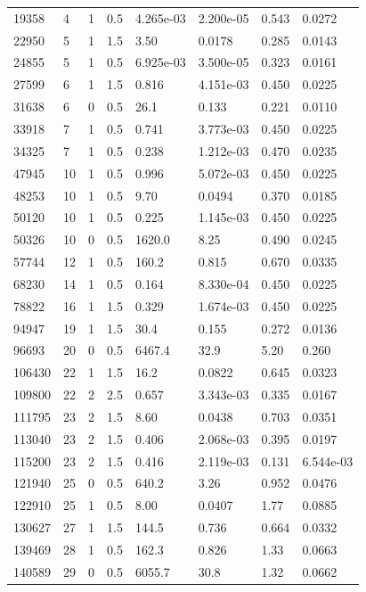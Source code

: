 \documentclass[preview]{standalone}
\begin{document}
{{\begin{tabular}{L{1.2cm}C{1.2cm} C{0.3cm}C{0.5cm} C{1.4cm}C{1.4cm} C{1.4cm}C{1.4cm}}
  19358  &     4  & 1     & 0.5 &  4.265e-03  & 2.200e-05  & 0.543 &  0.0272   \\ 
  22950  &     5  & 1     & 1.5 &  3.50  & 0.0178  & 0.285 &  0.0143   \\ 
  24855  &     5  & 1     & 0.5 &  6.925e-03  & 3.500e-05  & 0.323 &  0.0161   \\ 
  27599  &     6  & 1     & 1.5 &  0.816  & 4.151e-03  & 0.450 &  0.0225   \\ 
  31638  &     6  & 0     & 0.5 &  26.1  & 0.133  & 0.221 &  0.0110   \\ 
  33918  &     7  & 1     & 0.5 &  0.741  & 3.773e-03  & 0.450 &  0.0225   \\ 
  34325  &     7  & 1     & 0.5 &  0.238  & 1.212e-03  & 0.470 &  0.0235   \\ 
  47945  &    10  & 1     & 0.5 &  0.996  & 5.072e-03  & 0.450 &  0.0225   \\ 
  48253  &    10  & 1     & 0.5 &  9.70  & 0.0494  & 0.370 &  0.0185   \\ 
  50120  &    10  & 1     & 0.5 &  0.225  & 1.145e-03  & 0.450 &  0.0225   \\ 
  50326  &    10  & 0     & 0.5 &  1620.0  & 8.25  & 0.490 &  0.0245   \\ 
  57744  &    12  & 1     & 0.5 &  160.2  & 0.815  & 0.670 &  0.0335   \\ 
  68230  &    14  & 1     & 0.5 &  0.164  & 8.330e-04  & 0.450 &  0.0225   \\ 
  78822  &    16  & 1     & 1.5 &  0.329  & 1.674e-03  & 0.450 &  0.0225   \\ 
  94947  &    19  & 1     & 1.5 &  30.4  & 0.155  & 0.272 &  0.0136   \\ 
  96693  &    20  & 0     & 0.5 &  6467.4  & 32.9  & 5.20 &  0.260   \\ 
  106430  &    22  & 1     & 1.5 &  16.2  & 0.0822  & 0.645 &  0.0323   \\ 
  109800  &    22  & 2     & 2.5 &  0.657  & 3.343e-03  & 0.335 &  0.0167   \\ 
  111795  &    23  & 2     & 1.5 &  8.60  & 0.0438  & 0.703 &  0.0351   \\ 
  113040  &    23  & 2     & 1.5 &  0.406  & 2.068e-03  & 0.395 &  0.0197   \\ 
  115200  &    23  & 2     & 1.5 &  0.416  & 2.119e-03  & 0.131 &  6.544e-03   \\ 
  121940  &    25  & 0     & 0.5 &  640.2  & 3.26  & 0.952 &  0.0476   \\ 
  122910  &    25  & 1     & 0.5 &  8.00  & 0.0407  & 1.77 &  0.0885   \\ 
  130627  &    27  & 1     & 1.5 &  144.5  & 0.736  & 0.664 &  0.0332   \\ 
  139469  &    28  & 1     & 0.5 &  162.3  & 0.826  & 1.33 &  0.0663   \\ 
  140589  &    29  & 0     & 0.5 &  6055.7  & 30.8  & 1.32 &  0.0662   \\ 
\hline 
\end{tabular} 

}}
\end{document}
